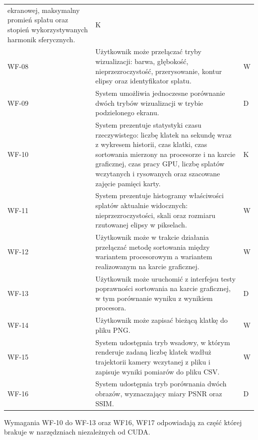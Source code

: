 \begin{table}[htbp]
\begin{tabularx}{\textwidth}{
      >{\raggedright\arraybackslash}p{}
      >{\raggedright\arraybackslash}X
      >{\centering\arraybackslash}p{}}
            ekranowej, maksymalny promień splatu oraz stopień
            wykorzystywanych harmonik sferycznych. & K \\
    WF-08 & Użytkownik może przełączać tryby wizualizacji: barwa,
            głębokość, nieprzezroczystość, przerysowanie, kontur elipsy
            oraz identyfikator splatu. & W \\
    WF-09 & System umożliwia jednoczesne porównanie dwóch trybów
            wizualizacji w trybie podzielonego ekranu. & D \\
    WF-10 & System prezentuje statystyki czasu rzeczywistego: liczbę klatek
            na sekundę wraz z wykresem historii, czas klatki, czas
            sortowania mierzony na procesorze i na karcie graficznej, czas
            pracy GPU, liczbę splatów wczytanych i rysowanych oraz
            szacowane zajęcie pamięci karty. & K \\
    WF-11 & System prezentuje histogramy właściwości splatów aktualnie
            widocznych: nieprzezroczystości, skali oraz rozmiaru
            rzutowanej elipsy w pikselach. & W \\
    WF-12 & Użytkownik może w trakcie działania przełączać metodę
            sortowania między wariantem procesorowym a wariantem
            realizowanym na karcie graficznej. & W \\
    WF-13 & Użytkownik może uruchomić z interfejsu testy poprawności
            sortowania na karcie graficznej, w tym porównanie wyniku
            z wynikiem procesora. & D \\
    WF-14 & Użytkownik może zapisać bieżącą klatkę do pliku PNG. & W \\
    WF-15 & System udostępnia tryb wsadowy, w którym renderuje zadaną
            liczbę klatek wzdłuż trajektorii kamery wczytanej z pliku
            i zapisuje wyniki pomiarów do pliku CSV. & W \\
    WF-16 & System udostępnia tryb porównania dwóch obrazów, wyznaczający
            miary PSNR oraz SSIM. & D \\
    \bottomrule
  \end{tabularx}
\end{table}
Wymagania WF-10 do WF-13 oraz WF16, WF17 odpowiadają za część której brakuje w narzędzniach niezależnych od CUDA. 

